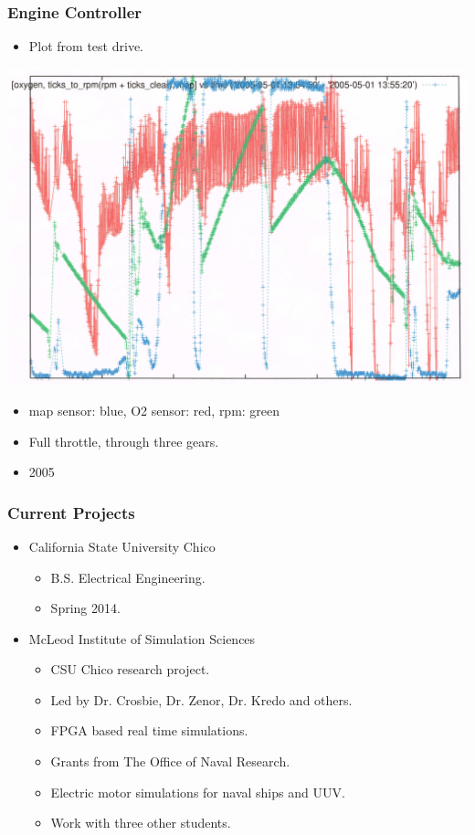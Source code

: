 \documentclass[gray]{beamer}
\begin{document}
\begin{frame}
\frametitle{Engine Controller}
\begin{center}
\begin{itemize}
\item Plot from test drive.
\end{itemize}
\includegraphics[scale=0.30]{jpg/01111401_mod2}
\begin{itemize}
\item map sensor: blue, O2 sensor: red, rpm: green
\item Full throttle, through three gears.
\item 2005
\end{itemize}
\end{center}
\end{frame}

\begin{frame}

\frametitle{Current Projects}
\begin{itemize}
\item California State University Chico
	\begin{itemize}
	\item B.S. Electrical Engineering.
	\item Spring 2014.
	\end{itemize}
\item McLeod Institute of Simulation Sciences
	\begin{itemize}
	\item CSU Chico research project.
	\item Led by Dr. Crosbie, Dr. Zenor, Dr. Kredo and others.
	\item FPGA based real time simulations.
	\item Grants from The Office of Naval Research.
	\item Electric motor simulations for naval ships and UUV. 
	\item Work with three other students.
	\end{itemize}
\end{itemize}

\end{frame}
\end{document}
